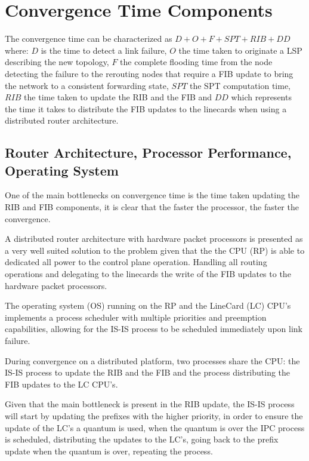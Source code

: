 \documentclass[a4paper, 11pt]{article}
\begin{document}
\section{Convergence Time Components}
The convergence time can be characterized as $D + O + F + SPT + RIB + DD$ where:
$D$ is the time to detect a link failure, 
$O$ the time taken to originate a LSP describing the new topology,
$F$ the complete flooding time from the node detecting the failure to the rerouting nodes that require a FIB update to bring the network to a consistent forwarding state, 
$SPT$ the SPT computation time,
$RIB$ the time taken to update the RIB and the FIB and 
$DD$ which represents the time it takes to distribute the FIB updates to the linecards when using a distributed router architecture.

\subsection{Router Architecture, Processor Performance, Operating System}
One of the main bottlenecks on convergence time is the time taken updating the RIB and FIB components,
it is clear that the faster the processor, the faster the convergence.

A distributed router architecture with hardware packet processors is presented as a very well suited solution to
the problem given that the the CPU (RP) is able to dedicated all power to the control plane operation.
Handling all routing operations and delegating to the linecards the write of the FIB updates to the hardware packet processors.

The operating system (OS) running on the RP and the LineCard (LC) CPU's  
implements a process scheduler with multiple priorities and preemption capabilities, 
allowing for the IS-IS process to be scheduled immediately upon link failure.

During convergence on a distributed platform, two processes share the CPU: 
the IS-IS process to update the RIB and the FIB and the process distributing the FIB updates to the LC CPU's.

Given that the main bottleneck is present in the RIB update, 
the IS-IS process will start by updating the prefixes with the higher priority, 
in order to ensure the update of the LC's a quantum is used, 
when the quantum is over the IPC process is scheduled, distributing the updates to the LC's, going back to the prefix update when the quantum is over, repeating the process.
\end{document}
